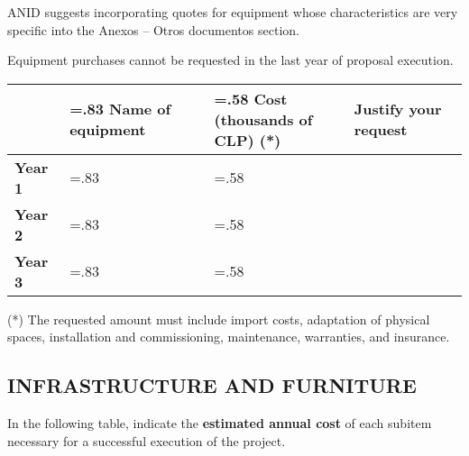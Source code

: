 \medskip

\noindent ANID suggests incorporating quotes for equipment whose characteristics are very specific into the Anexos – Otros documentos section.

\medskip

\noindent Equipment purchases cannot be requested in the last year of proposal execution.

\begin{center}
\begin{tabularx}{\linewidth}{l|>{\hsize=.83\hsize\linewidth\hsize}X|>{\hsize=.58\hsize\linewidth\hsize}X|>{\hsize=1.59\hsize\linewidth\hsize}X|}
\hhline{~---}
& \cellcolor{tcc}\centering\textbf{Name of equipment}
& \cellcolor{tcc}\centering\textbf{Cost\\\small{(thousands of CLP) (*)}}
& \cellcolor{tcc}\centering\textbf{Justify your request}
\tabularnewline\hline
\multicolumn{1}{|l|}{\cellcolor{tcc}\textbf{Year 1}}
& %
& %
& %
\tabularnewline\hline
\multicolumn{1}{|l|}{\cellcolor{tcc}\textbf{Year 2}}
& %
& %
& %
\tabularnewline\hline
\multicolumn{1}{|l|}{\cellcolor{tcc}\textbf{Year 3}}
& %
& %
& %
\tabularnewline\hline
\end{tabularx}
\end{center}

\noindent (*) The requested amount must include import costs, adaptation of physical spaces, installation and commissioning, maintenance, warranties, and insurance.

\subsection*{\uppercase{Infrastructure and furniture}}

In the following table, indicate the \textbf{estimated annual cost} of each subitem necessary for a successful execution of the project. 

